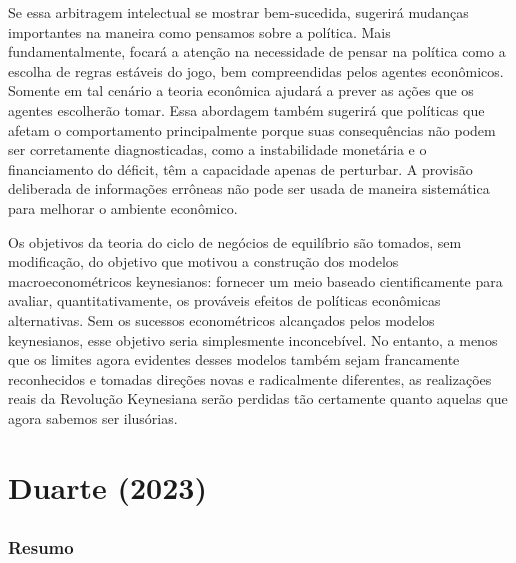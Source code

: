 \documentclass[12pt]{article}
\begin{document}
Se essa arbitragem intelectual se mostrar bem-sucedida, sugerirá mudanças importantes na maneira como pensamos sobre a política. Mais fundamentalmente, focará a atenção na necessidade de pensar na política como a escolha de regras estáveis do jogo, bem compreendidas pelos agentes econômicos. Somente em tal cenário a teoria econômica ajudará a prever as ações que os agentes escolherão tomar. Essa abordagem também sugerirá que políticas que afetam o comportamento principalmente porque suas consequências não podem ser corretamente diagnosticadas, como a instabilidade monetária e o financiamento do déficit, têm a capacidade apenas de perturbar. A provisão deliberada de informações errôneas não pode ser usada de maneira sistemática para melhorar o ambiente econômico.

Os objetivos da teoria do ciclo de negócios de equilíbrio são tomados, sem modificação, do objetivo que motivou a construção dos modelos macroeconométricos keynesianos: fornecer um meio baseado cientificamente para avaliar, quantitativamente, os prováveis efeitos de políticas econômicas alternativas. Sem os sucessos econométricos alcançados pelos modelos keynesianos, esse objetivo seria simplesmente inconcebível. No entanto, a menos que os limites agora evidentes desses modelos também sejam francamente reconhecidos e tomadas direções novas e radicalmente diferentes, as realizações reais da Revolução Keynesiana serão perdidas tão certamente quanto aquelas que agora sabemos ser ilusórias.

\section{\textbf{Duarte (2023)}}

\subsection{}

\subsubsection{\textbf{Resumo}}
\end{document}
